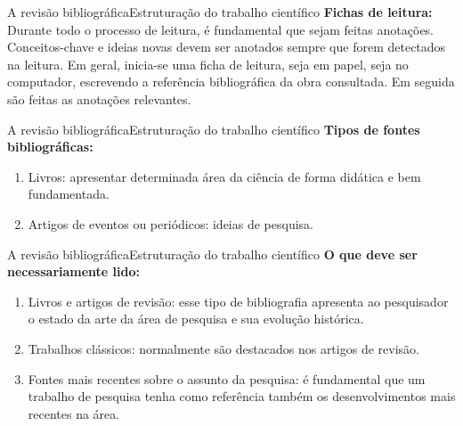 \documentclass[t]{beamer}
\begin{document}
\begin{ftst}{A revisão bibliográfica}{Estruturação do trabalho científico}
\justifying
\textbf{Fichas de leitura:}
\vone
Durante todo o processo de leitura, é fundamental que sejam feitas anotações.
\vone
Conceitos-chave e ideias novas devem ser anotados sempre que forem detectados na leitura. 
\vone
Em geral, inicia-se uma ficha de leitura, seja em papel, seja no computador,
escrevendo a referência bibliográfica da obra consultada. Em seguida são feitas as anotações relevantes.


\end{ftst}


\begin{ftst}{A revisão bibliográfica}{Estruturação do trabalho científico}
\justifying
\textbf{Tipos de fontes bibliográficas:}
\vone
\begin{enumerate}
    \item Livros: apresentar determinada área da ciência de forma didática e bem fundamentada.
    \item Artigos de eventos ou periódicos: ideias de pesquisa.
\end{enumerate}


\end{ftst}


\begin{ftst}{A revisão bibliográfica}{Estruturação do trabalho científico}
\justifying
\textbf{O que deve ser necessariamente lido:}
\vone
\begin{enumerate}
    \item Livros e artigos de revisão: esse tipo de bibliografia apresenta ao pesquisador o estado
da arte da área de pesquisa e sua evolução histórica.
    \item Trabalhos clássicos: normalmente são destacados nos artigos de revisão.
    \item Fontes mais recentes sobre o assunto da pesquisa: é fundamental que um trabalho de pesquisa tenha como referência também os desenvolvimentos mais recentes na área.
\end{enumerate}


\end{ftst}

\end{document}
